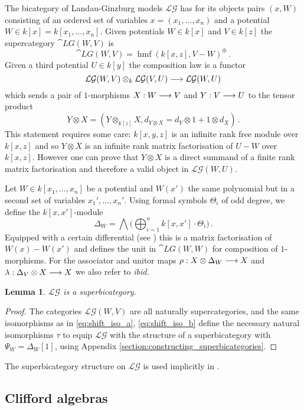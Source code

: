 \documentclass[english,letter paper,12pt,leqno]{article}
\newtheorem{lemma}[theorem]{Lemma}
\theoremstyle{example}
\numberwithin{equation}{section}
\def\LG{\mathcal{LG}}
\DeclareMathOperator{\hmf}{hmf}
\begin{document}
The bicategory of Landau-Ginzburg models $\LG$ has for its objects pairs $(x,W)$ consisting of an ordered set of variables $x = (x_1,\ldots,x_n)$ and a potential $W \in k[x] = k[x_1,\ldots,x_n]$. Given potentials $W \in k[x]$ and $V \in k[z]$ the supercategory $\cat{LG}(W,V)$ is
\[
\cat{LG}(W,V) = \hmf(k[x,z], V - W)^{\oplus}\,.
\]
Given a third potential $U \in k[y]$ the composition law is a functor
\[
\LG(W,V) \otimes_k \LG(V, U) \lto \LG(W, U)
\]
which sends a pair of $1$-morphisms $X: W \longrightarrow V$ and $Y: V \longrightarrow U$ to the tensor product
\begin{equation}\label{eq:tensor_comp}
Y \otimes X = ( Y \otimes_{k[z]} X, d_{Y \otimes X} = d_Y \otimes 1 + 1 \otimes d_X )\,.
\end{equation}
This statement requires some care: $k[x,y,z]$ is an infinite rank free module over $k[x,z]$ and so $Y \otimes X$ is an infinite rank matrix factorisation of $U - W$ over $k[x,z]$. However one can prove that $Y \otimes X$ is a direct summand of a finite rank matrix factorisation \cite{dm1102.2957} and therefore a valid object in $\LG(W,U)$.

Let $W \in k[x_1,\ldots,x_n]$ be a potential and $W(x')$ the same polynomial but in a second set of variables $x_1',\ldots,x_n'$. Using formal symbols $\Theta_i$ of odd degree, we define the $k[x,x']$-module
\[
\Delta_W = \bigwedge \big( \bigoplus_{i=1}^n k[x,x'] \cdot \Theta_i \big)\,.
\]
Equipped with a certain differential (see \cite{lgdual}) this is a matrix factorisation of $W(x) - W(x')$ and defines the unit in $\cat{LG}(W,W)$ for composition of $1$-morphisms. For the associator and unitor maps $\rho: X \otimes \Delta_W \longrightarrow X$ and $\lambda: \Delta_V \otimes X \longrightarrow X$ we also refer to \emph{ibid.}

\begin{lemma} $\LG$ is a superbicategory.
\end{lemma}
\begin{proof}
The categories $\LG(W,V)$ are all naturally supercategories, and the same isomorphisms as in \eqref{eq:shift_iso_a}, \eqref{eq:shift_iso_b} define the necessary natural isomorphisms $\tau$ to equip $\LG$ with the structure of a superbicategory with $\Psi_W = \Delta_W[1]$, using Appendix \ref{section:constructing_superbicategories}.
\end{proof}

The superbicategory structure on $\LG$ is used implicitly in \cite[Section 7]{lgdual}.

\subsection{Clifford algebras}\label{section:clifford_algs}
\end{document}
